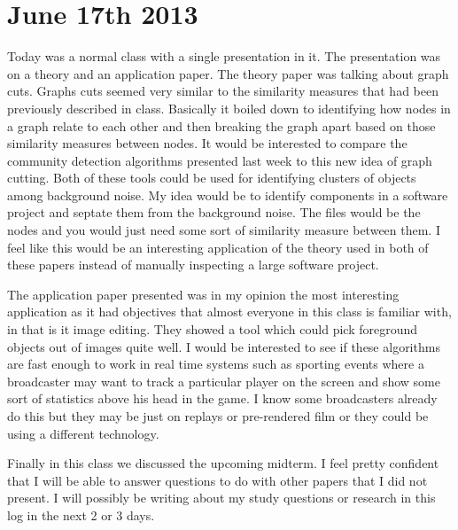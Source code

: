 \documentclass[conference]{IEEEtran}
\begin{document}
\section{June 17th 2013}
Today was a normal class with a single presentation in it. The presentation was on a theory and an 
application paper. The theory paper was talking about graph cuts. Graphs cuts seemed very similar to
the similarity measures that had been previously described in class. Basically it boiled down to
identifying how nodes in a graph relate to each other and then breaking the graph apart based on those
similarity measures between nodes. It would be interested to compare the community detection algorithms
presented last week to this new idea of graph cutting. Both of these tools could be used for identifying
clusters of objects among background noise. My idea would be to identify components in a software project
and septate them from the background noise. The files would be the nodes and you would just need some
sort of similarity measure between them. I feel like this would be an interesting application of the
theory used in both of these papers instead of manually inspecting a large software project.

The application paper presented was in my opinion the most interesting application as it had objectives
that almost everyone in this class is familiar with, in that is it image editing. They showed a tool which
could pick foreground objects out of images quite well. I would be interested to see if these algorithms
are fast enough to work in real time systems such as sporting events where a broadcaster may want to 
track a particular player on the screen and show some sort of statistics above his head
in the game. I know some broadcasters already do this but they may be just on replays or pre-rendered 
film or they could be using a different technology.

Finally in this class we discussed the upcoming midterm. I feel pretty confident that I will be able
to answer questions to do with other papers that I did not present. I will possibly be writing about
my study questions or research in this log in the next 2 or 3 days.
\end{document}
